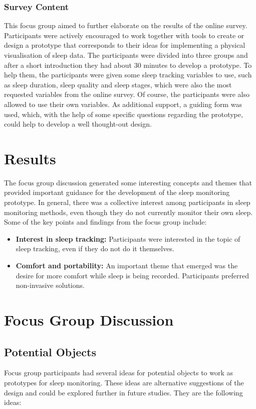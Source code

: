 \documentclass[
  a4paper,  %
  twoside,  %
  bibliography=totoc,
  headsepline,
  cleardoublepage=empty,
  parskip=half,
  draft=false
]{scrbook}
\begin{document}
\subsubsection{Survey Content}
This focus group aimed to further elaborate on the results of the online survey. Participants were actively encouraged to work together with tools to create or design a prototype that corresponds to their ideas for implementing a physical visualisation of sleep data. The participants were divided into three groups and after a short introduction they had about 30 minutes to develop a prototype. To help them, the participants were given some sleep tracking variables to use, such as sleep duration, sleep quality and sleep stages, which were also the most requested variables from the online survey. Of course, the participants were also allowed to use their own variables. As additional support, a guiding form was used, which, with the help of some specific questions regarding the prototype, could help to develop a well thought-out design.
\section{Results}
The focus group discussion generated some interesting concepts and themes that provided important guidance for the development of the sleep monitoring prototype. In general, there was a collective interest among participants in sleep monitoring methods, even though they do not currently monitor their own sleep. Some of the key points and findings from the focus group include:

\begin{itemize}
    \item \textbf{Interest in sleep tracking:} Participants were interested in the topic of sleep tracking, even if they do not do it themselves.
    \item \textbf{Comfort and portability:} An important theme that emerged was the desire for more comfort while sleep is being recorded. Participants preferred non-invasive solutions.
\end{itemize}
\section{Focus Group Discussion}
\subsection{Potential Objects}
Focus group participants had several ideas for potential objects to work as prototypes for sleep monitoring. These ideas are alternative suggestions of the design and could be explored further in future studies. They are the following ideas:
\end{document}
